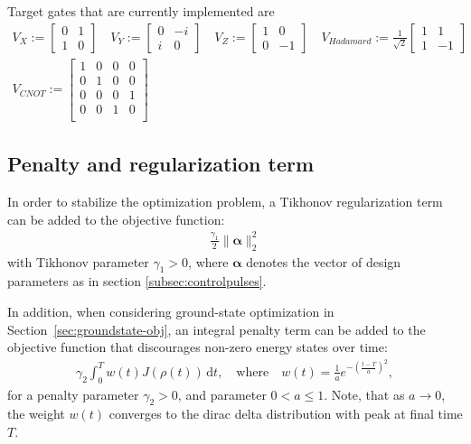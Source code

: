 \documentclass[letterpaper]{article}
\begin{document}
Target gates that are currently implemented are
\begin{align}
  V_{X} := \begin{bmatrix} 0 & 1 \\ 1 & 0  \end{bmatrix} \quad
  V_{Y} := \begin{bmatrix} 0 & -i \\ i & 0 \end{bmatrix} \quad
  V_{Z} := \begin{bmatrix} 1 & 0 \\ 0 & -1 \end{bmatrix} \quad 
  V_{Hadamard} := \frac{1}{\sqrt{2}} 
           \begin{bmatrix} 1 & 1 \\ 1 & -1 \end{bmatrix} \\
  V_{CNOT} := \begin{bmatrix} 1  & 0 & 0 & 0 \\ 
                               0  & 1 & 0 & 0 \\ 
                               0  & 0 & 0 & 1 \\ 
                               0  & 0 & 1 & 0 \\ 
                \end{bmatrix}
\end{align}

\subsection{Penalty and regularization term}
In order to stabilize the optimization problem, a Tikhonov regularization term can be added to the objective function:
\begin{align}
 \frac{\gamma_1}{2} \| \boldsymbol{\alpha} \|^2_2
\end{align}
with Tikhonov parameter $\gamma_1 > 0$, where $\boldsymbol{\alpha}$ denotes the vector of design parameters as in section \ref{subsec:controlpulses}.


In addition, when considering ground-state optimization in
Section~\ref{sec:groundstate-obj}, an integral penalty term can be added to the objective function that discourages non-zero energy states over time:
\begin{align}
  \gamma_2 \int_0^T w(t) J\left(\rho(t)\right) \, \mathrm{d}t, \quad \text{where} \quad w(t) =
  \frac{1}{a} e^{ -\left(\frac{t-T}{a} \right)^2},
\end{align}
for a penalty parameter $\gamma_2 > 0$, and parameter $0 < a \leq 1$. 
Note, that as $a\to 0$, the weight $w(t)$ converges to the dirac delta
distribution with peak at final time $T$. 
\end{document}

